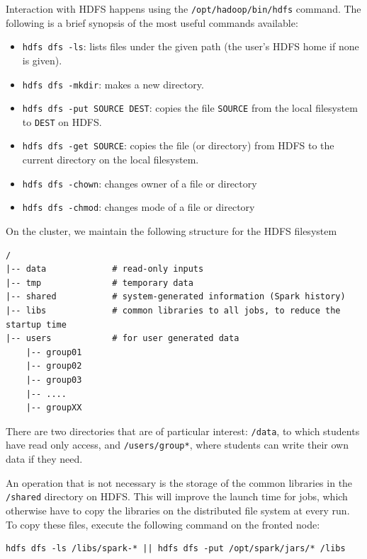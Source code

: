 \documentclass[justified]{tufte-handout}
\providecommand{\tightlist}{%
  \setlength{\itemsep}{0pt}\setlength{\parskip}{0pt}}
\begin{document}
Interaction with HDFS happens using the \texttt{/opt/hadoop/bin/hdfs}
command. The following is a brief synopsis of the most useful commands
available:

\begin{itemize}
\tightlist
\item
  \texttt{hdfs\ dfs\ -ls}: lists files under the given path (the user's
  HDFS home if none is given).
\item
  \texttt{hdfs\ dfs\ -mkdir}: makes a new directory.
\item
  \texttt{hdfs\ dfs\ -put\ SOURCE\ DEST}: copies the file
  \texttt{SOURCE} from the local filesystem to \texttt{DEST} on HDFS.
\item
  \texttt{hdfs\ dfs\ -get\ SOURCE}: copies the file (or directory) from
  HDFS to the current directory on the local filesystem.
\item
  \texttt{hdfs\ dfs\ -chown}: changes owner of a file or directory
\item
  \texttt{hdfs\ dfs\ -chmod}: changes mode of a file or directory
\end{itemize}

On the cluster, we maintain the following structure for the HDFS
filesystem

\begin{verbatim}
/
|-- data             # read-only inputs
|-- tmp              # temporary data
|-- shared           # system-generated information (Spark history)
|-- libs             # common libraries to all jobs, to reduce the startup time
|-- users            # for user generated data
    |-- group01
    |-- group02
    |-- group03
    |-- ....
    |-- groupXX
\end{verbatim}

There are two directories that are of particular interest:
\texttt{/data}, to which students have read only access, and
\texttt{/users/group*}, where students can write their own data if they
need.

An operation that is not necessary is the storage of the common
libraries in the \texttt{/shared} directory on HDFS. This will improve
the launch time for jobs, which otherwise have to copy the libraries on
the distributed file system at every run. To copy these files, execute
the following command on the fronted node:

\begin{verbatim}
hdfs dfs -ls /libs/spark-* || hdfs dfs -put /opt/spark/jars/* /libs
\end{verbatim}
\end{document}
